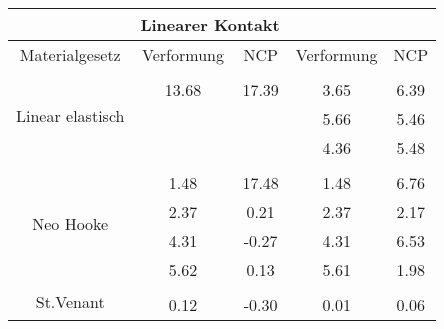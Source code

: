 \begin{table} 
\centering 
\begin{tabular}{c|cc|cc|} 
\cline{2-5} 
 & \multicolumn{2}{|c|}{Linearer Kontakt} &  \\ 
\hline 
\multicolumn{1}{|c|}{Materialgesetz} & \multicolumn{1}{c|}{Verformung} & \multicolumn{1}{c|}{NCP} & \multicolumn{1}{c|}{Verformung} & \multicolumn{1}{c|}{NCP} \\ 
\hline 
\multicolumn{1}{|c|}{\multirow{4}{*}{Linear elastisch}} &\multicolumn{1}{|c|}{} & \multicolumn{1}{|c|}{} & \multicolumn{1}{|c|}{} & \multicolumn{1}{|c|}{} \\ 
\multicolumn{1}{|c|}{} & \multicolumn{1}{|c|}{     13.68} & \multicolumn{1}{|c|}{     17.39} & \multicolumn{1}{|c|}{      3.65} & \multicolumn{1}{|c|}{      6.39} \\ 
\multicolumn{1}{|c|}{} & \multicolumn{1}{|c|}{} & \multicolumn{1}{|c|}{} & \multicolumn{1}{|c|}{      5.66} & \multicolumn{1}{|c|}{      5.46} \\ 
\multicolumn{1}{|c|}{} & \multicolumn{1}{|c|}{} & \multicolumn{1}{|c|}{} & \multicolumn{1}{|c|}{      4.36} & \multicolumn{1}{|c|}{      5.48} \\ 
\hline 
\multicolumn{1}{|c|}{\multirow{5}{*}{Neo Hooke}} &\multicolumn{1}{|c|}{} & \multicolumn{1}{|c|}{} & \multicolumn{1}{|c|}{} & \multicolumn{1}{|c|}{} \\ 
\multicolumn{1}{|c|}{} & \multicolumn{1}{|c|}{      1.48} & \multicolumn{1}{|c|}{     17.48} & \multicolumn{1}{|c|}{      1.48} & \multicolumn{1}{|c|}{      6.76} \\ 
\multicolumn{1}{|c|}{} & \multicolumn{1}{|c|}{      2.37} & \multicolumn{1}{|c|}{      0.21} & \multicolumn{1}{|c|}{      2.37} & \multicolumn{1}{|c|}{      2.17} \\ 
\multicolumn{1}{|c|}{} & \multicolumn{1}{|c|}{      4.31} & \multicolumn{1}{|c|}{     -0.27} & \multicolumn{1}{|c|}{      4.31} & \multicolumn{1}{|c|}{      6.53} \\ 
\multicolumn{1}{|c|}{} & \multicolumn{1}{|c|}{      5.62} & \multicolumn{1}{|c|}{      0.13} & \multicolumn{1}{|c|}{      5.61} & \multicolumn{1}{|c|}{      1.98} \\ 
\hline 
\multicolumn{1}{|c|}{\multirow{91}{*}{St.Venant}} &\multicolumn{1}{|c|}{} & \multicolumn{1}{|c|}{} & \multicolumn{1}{|c|}{} & \multicolumn{1}{|c|}{} \\ 
\multicolumn{1}{|c|}{} & \multicolumn{1}{|c|}{      0.12} & \multicolumn{1}{|c|}{     -0.30} & \multicolumn{1}{|c|}{      0.01} & \multicolumn{1}{|c|}{      0.06} \\ 

\end{tabular}
\end{table}
